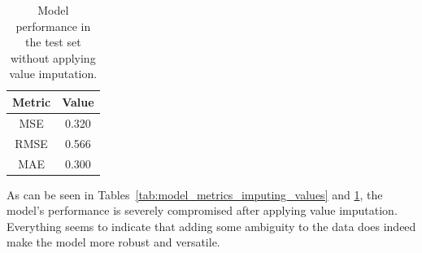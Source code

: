 \begin{table}[H]
    \centering
    \begin{tabular}{|c|c|}
    \hline
    \textbf{Metric} & \textbf{Value} \\
    \hline
    MSE & 0.320 \\
    RMSE & 0.566 \\
    MAE & 0.300 \\
    \hline
    \end{tabular}
    \caption{Model performance in the test set without applying value imputation.}
    \label{tab:test_metrics_without_values_imputation}
\end{table}

As can be seen in Tables~\ref{tab:model_metrics_imputing_values} and \ref{tab:test_metrics_without_values_imputation}, the model's performance is severely compromised after applying value imputation. Everything seems to indicate that adding some ambiguity to the data does indeed make the model more robust and versatile.
